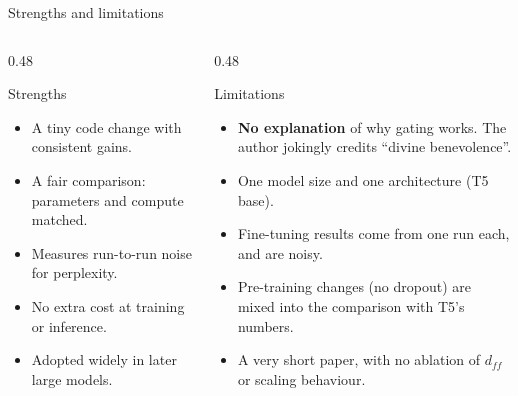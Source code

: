 \documentclass[aspectratio=169,11pt]{beamer}
\begin{document}
\begin{frame}{Strengths and limitations}
  \begin{columns}[T]
    \begin{column}{0.48\textwidth}
      \begin{exampleblock}{Strengths}
        \small
        \begin{itemize}
          \item A tiny code change with consistent gains.
          \item A fair comparison: parameters and compute matched.
          \item Measures run-to-run noise for perplexity.
          \item No extra cost at training or inference.
          \item Adopted widely in later large models.
        \end{itemize}
      \end{exampleblock}
    \end{column}
    \begin{column}{0.48\textwidth}
      \begin{alertblock}{Limitations}
        \small
        \begin{itemize}
          \item \textbf{No explanation} of why gating works. The author jokingly credits ``divine benevolence''.
          \item One model size and one architecture (T5 base).
          \item Fine-tuning results come from one run each, and are noisy.
          \item Pre-training changes (no dropout) are mixed into the comparison with T5's numbers.
          \item A very short paper, with no ablation of $d_{ff}$ or scaling behaviour.
        \end{itemize}
      \end{alertblock}
    \end{column}
  \end{columns}
\end{frame}
\end{document}
